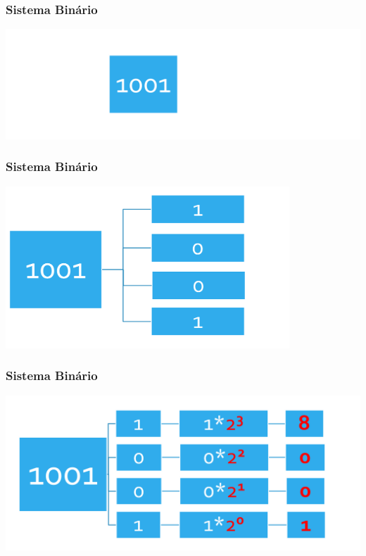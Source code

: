 \documentclass[aspectratio=169,
				xcolor=table]{beamer}
\begin{document}
		\begin{frame}
			\frametitle{Sistema Binário}
			\includegraphics[width=\textwidth, keepaspectratio]{../figs/cap02/binario01.png} 		
		\end{frame}
	
		\begin{frame}
			\frametitle{Sistema Binário}
			\includegraphics[width=0.8\textwidth, keepaspectratio]{../figs/cap02/binario02.png} 		
		\end{frame}
	
		\begin{frame}
			\frametitle{Sistema Binário}
			\includegraphics[width=\textwidth, keepaspectratio]{../figs/cap02/binario03.png} 		
		\end{frame}	
		
\end{document}
